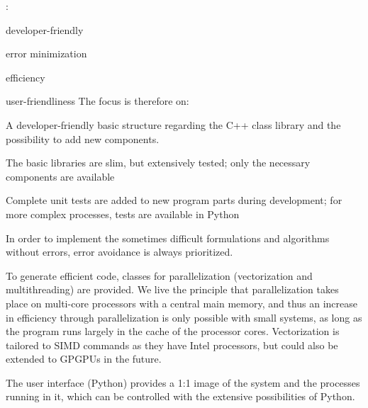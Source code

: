 : 
\bn
  \item developer-friendly
  \item error minimization
  \item efficiency
  \item user-friendliness
\en
The focus is therefore on:
\bi
    \item A developer-friendly basic structure regarding the C++ class library and the possibility to add new components.
    \item The basic libraries are slim, but extensively tested; only the necessary components are available
    \item Complete unit tests are added to new program parts during development; for more complex processes, tests are available in Python
    \item In order to implement the sometimes difficult formulations and algorithms without errors, error avoidance is always prioritized.
    \item To generate efficient code, classes for parallelization (vectorization and multithreading) are provided. We live the principle that parallelization takes place on multi-core processors with a central main memory, and thus an increase in efficiency through parallelization is only possible with small systems, as long as the program runs largely in the cache of the processor cores. Vectorization is tailored to SIMD commands as they have Intel processors, but could also be extended to GPGPUs in the future.
    \item The user interface (Python) provides a 1:1 image of the system and the processes running in it, which can be controlled with the extensive possibilities of Python.
\ei

